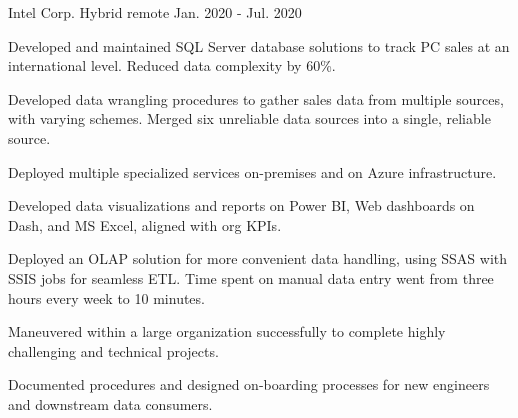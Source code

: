 \begin{cventries}
	{Intel Corp.} %
	{Hybrid remote} %
	{Jan. 2020 {-} Jul. 2020} %
	{
		\begin{cvitems}
			\item {Developed and maintained SQL Server database solutions to track PC sales at an international level. Reduced data complexity by 60\%.}
			\item {Developed data wrangling procedures to gather sales data from multiple sources, with varying schemes. Merged six unreliable data sources into a single, reliable source.}
			\item {Deployed multiple specialized services on-premises and on Azure infrastructure.}
			\item {Developed data visualizations and reports on Power BI, Web dashboards on Dash, and MS Excel, aligned with org KPIs.}
			\item {Deployed an OLAP solution for more convenient data handling, using SSAS with SSIS jobs for seamless ETL. Time spent on manual data entry went from three hours every week to 10 minutes.}
			\item {Maneuvered within a large organization successfully to complete highly challenging and technical projects.}
			\item {Documented procedures and designed on-boarding processes for new engineers and downstream data consumers.}
		\end{cvitems}
	}
\end{cventries}
